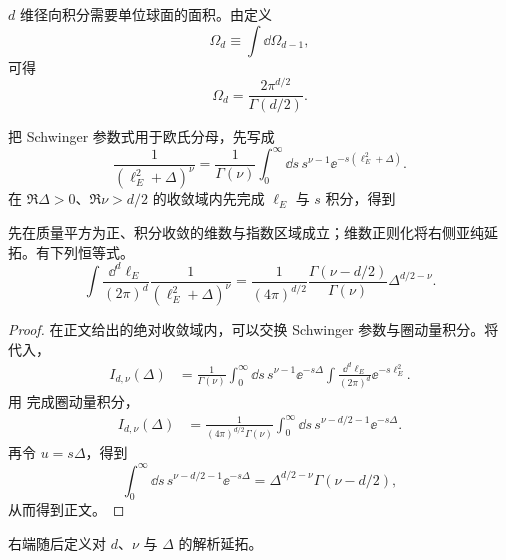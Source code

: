 
$d$ 维径向积分需要单位球面的面积。由定义
\begin{equation}
\Omega_d\equiv\int\dd\Omega_{d-1},
\label{eq:d-sphere-solid-angle-definition-dp68}
\end{equation}
可得
\begin{equation}
{
\Omega_d=\frac{2\pi^{d/2}}{\Gamma(d/2)}.}
\label{eq:d-sphere-solid-angle-dp21}
\end{equation}

把 Schwinger 参数式用于欧氏分母，先写成
\begin{equation}
\frac1{(\ell_E^2+\Delta)^\nu}
=\frac1{\Gamma(\nu)}
\int_0^\infty\dd s\,s^{\nu-1}\ee^{-s(\ell_E^2+\Delta)}.
\label{eq:euclidean-master-schwinger-dp68}
\end{equation}
在 $\Re\Delta>0$、$\Re\nu>d/2$ 的收敛域内先完成 $\ell_E$ 与 $s$ 积分，得到
\begin{proposition}
先在质量平方为正、积分收敛的维数与指数区域成立；维数正则化将右侧亚纯延拓。有下列恒等式。
\begin{equation}
{
\int\frac{\dd^d \ell_E}{(2\pi)^d}
\frac1{(\ell_E^2+\Delta)^\nu}
=\frac1{(4\pi)^{d/2}}
\frac{\Gamma(\nu-d/2)}{\Gamma(\nu)}
\Delta^{d/2-\nu}.}
\label{eq:euclidean-master-integral-dp21}
\end{equation}
\end{proposition}
\begin{proof}
在正文给出的绝对收敛域内，可以交换 Schwinger 参数与圈动量积分。将 代入，
\begin{align*}
 I_{d,\nu}(\Delta)
 &=\frac1{\Gamma(\nu)}
 \int_0^\infty\dd s\,s^{\nu-1}\ee^{-s\Delta}
 \int\frac{\dd^d \ell_E}{(2\pi)^d}\ee^{-s\ell_E^2}.
\end{align*}
用 完成圈动量积分，
\begin{align*}
 I_{d,\nu}(\Delta)
 &=\frac1{(4\pi)^{d/2}\Gamma(\nu)}
 \int_0^\infty\dd s\,
 s^{\nu-d/2-1}\ee^{-s\Delta}.
\end{align*}
再令 $u=s\Delta$，得到
\begin{equation*}
 \int_0^\infty\dd s\,s^{\nu-d/2-1}\ee^{-s\Delta}
 =\Delta^{d/2-\nu}\Gamma(\nu-d/2),
\end{equation*}
从而得到正文。
\end{proof}
右端随后定义对 $d$、$\nu$ 与 $\Delta$ 的解析延拓。

